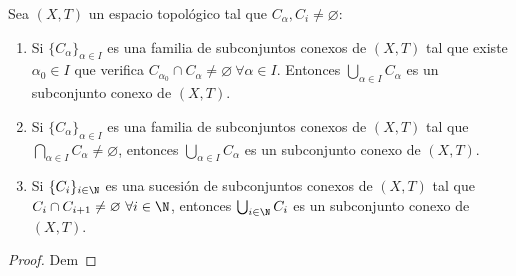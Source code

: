 \begin{nprop}
  Sea $(X,T)$ un espacio topológico tal que $C_\alpha, C_i \neq \varnothing$:
  \begin{enumerate}
      \item Si $\{C_\alpha\}_{\alpha \in I}$ es una familia de subconjuntos conexos de $(X,T)$ tal que existe $\alpha_0 \in I$ que verifica $C_{\alpha_0} \cap C_\alpha \neq \varnothing \ \forall \alpha \in I$. Entonces $\bigcup_{\alpha \in I} C_\alpha$ es un subconjunto conexo de $(X,T)$.
      \item Si $\{C_\alpha\}_{\alpha \in I}$ es una familia de subconjuntos conexos de $(X,T)$ tal que $\bigcap_{\alpha \in I} C_\alpha \neq \varnothing$, entonces $\bigcup_{\alpha \in I} C_\alpha$ es un subconjunto conexo de $(X,T)$.
      \item Si $\{C_i\}_{i \in \N}$ es una sucesión de subconjuntos conexos de $(X,T)$ tal que $C_i \cap C_{i+1} \neq \varnothing \ \forall i \in \N$, entonces $\bigcup_{i \in \N}C_i$ es un subconjunto conexo de $(X,T)$.
  \end{enumerate}
\end{nprop}
\begin{proof}
    Dem
\end{proof}